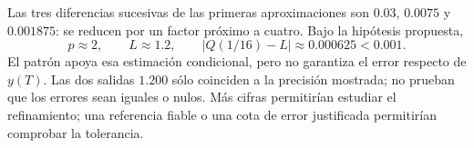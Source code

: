 Las tres diferencias sucesivas de las primeras aproximaciones son \(0.03\), \(0.0075\) y \(0.001875\): se reducen por un factor próximo a cuatro. Bajo la hipótesis propuesta,
\[
p\approx2,\qquad L\approx1.2,\qquad
|Q(1/16)-L|\approx0.000625<0.001.
\]
El patrón apoya esa estimación condicional, pero no garantiza el error respecto de \(y(T)\). Las dos salidas \(1.200\) sólo coinciden a la precisión mostrada; no prueban que los errores sean iguales o nulos. Más cifras permitirían estudiar el refinamiento; una referencia fiable o una cota de error justificada permitirían comprobar la tolerancia.
